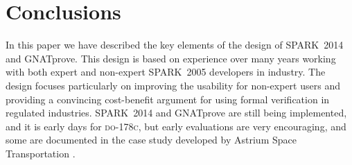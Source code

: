 \documentclass[sttt,final]{svjour}
\newcommand{\DOC}{\textsc{do-178c}}
\newcommand{\gnatprove}{GNATprove\xspace}
\newcommand{\oldspark}{SPARK~2005\xspace}
\newcommand{\newspark}{SPARK~2014\xspace}
\begin{document}
\section{Conclusions}
\label{conclusions}
In this paper we have described the key elements of the design of
\newspark and \gnatprove. This design is based on experience over many
years working with both expert and non-expert \oldspark developers in
industry. The design focuses particularly on improving the usability for
non-expert users and providing a convincing cost-benefit argument for
using formal verification in regulated industries. \newspark and
\gnatprove are still being implemented, and it is early days for
\DOC, but early evaluations are very encouraging, and some are
documented in the case study developed by Astrium Space Transportation
\cite{dasia2013}.
%


\end{document}
